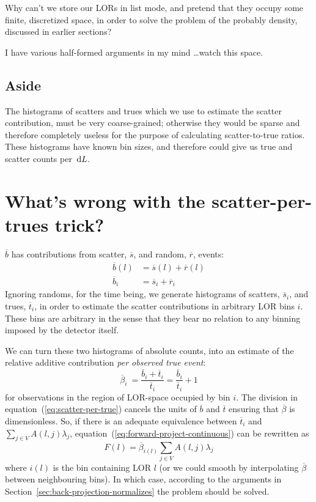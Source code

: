 \documentclass[10pt, a4paper, twocolumn]{article} %
\newcommand\dd[1]  { \,\textrm d{#1} }   %
\begin{document}
Why can't we store our LORs in list mode, and pretend that they occupy some
finite, discretized space, in order to solve the problem of the probably
density, discussed in earlier sections?

I have various half-formed arguments in my mind \ldots watch this space.

\subsection{Aside}

The histograms of scatters and trues which we use to estimate the scatter
contribution, must be very coarse-grained; otherwise they would be sparse and
therefore completely useless for the purpose of calculating scatter-to-true
ratios. These histograms have known bin sizes, and therefore could give us true
and scatter counts per \(\dd L\).

\section{What's wrong with the scatter-per-trues trick?}\label{sec:scatter-per-true-trick}

\(\overline{b}\) has contributions from scatter, \(\overline{s}\), and random,
\(\overline{r}\), events:
\begin{align*}
  \overline{b}(l)  &= \overline{s}(l) + \overline{r}(l) \\
  \overline{b}_{i}  &= \overline{s}_{i} + \overline{r}_{i}
\end{align*}
Ignoring randoms, for the time being, we generate histograms of scatters,
\(\overline{s}_{i}\), and trues, \(\overline{t}_{i}\), in order to estimate the
scatter contributions in arbitrary LOR bins \(i\). These bins are arbitrary in
the sense that they bear no relation to any binning imposed by the detector
itself.

We can turn these two histograms of absolute counts, into an estimate of the
relative additive contribution \textit{per observed true event}:
\begin{equation}
  \overline{\beta}_{i}\
  =
  \frac{\overline{b}_{i} + \overline{t}_{i}}{\overline{t}_{i}}
  =
  \frac{\overline{b}_{i}}{\overline{t}_{i}} + 1\label{eq:scatter-per-true}
\end{equation}
for observations in the region of LOR-space occupied by bin \(i\). The division
in equation~(\ref{eq:scatter-per-true}) cancels the units of \(\overline{b}\) and
\(\overline{t}\) ensuring that \(\overline{\beta}\) is dimensionless. So, if
there is an adequate equivalence between \(\overline{t}_{i}\) and
\(\sum_{j\in V}A(l,j)\lambda_{j}\),
equation~(\ref{eq:forward-project-continuous}) can be rewritten as
\[
  F(l) =  \overline{\beta}_{i(l)} \sum_{j\in V}A(l,j)\lambda_{j}
\]
where \(i(l)\) is the bin containing LOR \(l\) (or we could smooth by
interpolating \(\overline{\beta}\) between neighbouring bins). In which case,
according to the arguments in Section~\ref{sec:back-projection-normalizes} the
problem should be solved.
\end{document}
